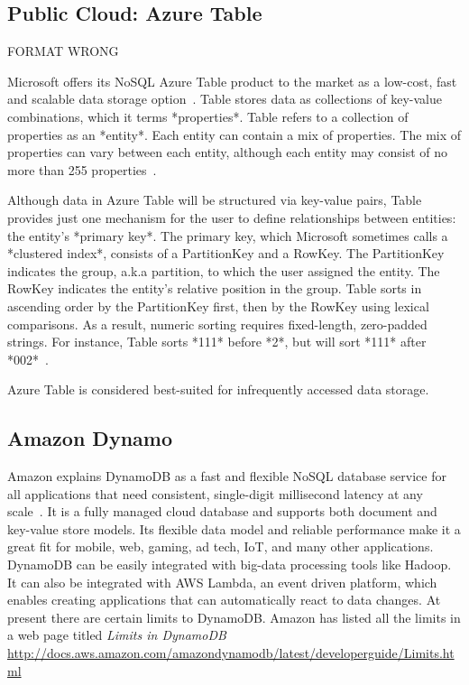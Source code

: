 {     \pv
     
\subsection{Public Cloud: Azure Table}

     FORMAT WRONG

     Microsoft offers its NoSQL Azure Table product to the market as a
     low-cost, fast and scalable data storage
     option~\cite{www-what-to-use}. Table stores data as collections
     of key-value combinations, which it terms *properties*.  Table
     refers to a collection of properties as an *entity*.  Each entity
     can contain a mix of properties.  The mix of properties can vary
     between each entity, although each entity may consist of no more
     than 255 properties~\cite{www-blobqueuetable}.

     Although data in Azure Table will be structured via key-value
     pairs, Table provides just one mechanism for the user to define
     relationships between entities: the entity's *primary key*.  The
     primary key, which Microsoft sometimes calls a *clustered index*,
     consists of a PartitionKey and a RowKey.  The PartitionKey
     indicates the group, a.k.a partition, to which the user assigned
     the entity.  The RowKey indicates the entity's relative position
     in the group.  Table sorts in ascending order by the PartitionKey
     first, then by the RowKey using lexical comparisons.  As a
     result, numeric sorting requires fixed-length, zero-padded
     strings.  For instance, Table sorts *111* before *2*, but will
     sort *111* after *002*~\cite{www-scalable-partitioning}.

     Azure Table is considered best-suited for infrequently accessed
     data storage.

     \pv

\subsection{Amazon Dynamo}

Amazon explains DynamoDB as a fast and flexible NoSQL database service
for all applications that need consistent, single-digit millisecond
latency at any scale~\cite{www.dyndb}.  It is a fully managed cloud
database and supports both document and key-value store models.  Its
flexible data model and reliable performance make it a great fit for
mobile, web, gaming, ad tech, IoT, and many other applications.
DynamoDB can be easily integrated with big-data processing tools like
Hadoop. It can also be integrated with AWS Lambda, an event driven
platform, which enables creating applications that can automatically
react to data changes. At present there are certain limits to
DynamoDB. Amazon has listed all the limits in a web page titled
\textit{Limits in DynamoDB }
\url{http://docs.aws.amazon.com/amazondynamodb/latest/developerguide/Limits.html}

}
